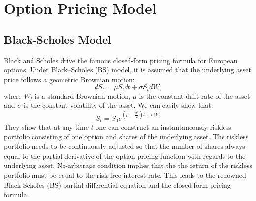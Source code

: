 \documentclass[letterpaper,12pt,titlepage,oneside,final]{book}
\numberwithin{equation}{section}
\theoremstyle{definition}
\begin{document}
\section{Option Pricing Model}
\label{sec:pricing}
\subsection{Black-Scholes Model}
\label{sec:bs}


Black and Scholes \cite{black1973pricing} drive the famous closed-form pricing formula for European options. 
Under Black–Scholes (BS) model, it is assumed that the underlying asset price follows a geometric Brownian motion:
\[
dS_t=\mu S_t dt+\sigma S_t dW_t
\]
where $W_t$ is a standard Brownian motion, $\mu$ is the constant drift rate of  the asset and $\sigma$ is the constant volatility of the asset. We can easily show that:
\[
S_t=S_0 e^{(\mu-\frac{\sigma^2}{2})t+\sigma W_t}
\]
They show that at any time $t$ one can construct an instantaneously riskless portfolio consisting of one option and shares of the underlying asset. The riskless portfolio needs to be continuously adjusted so that the number of shares always equal to the partial derivative of the option pricing function with regards to the underlying asset. No-arbitrage condition implies that the the return of the riskless portfolio must be equal to the risk-free interest rate. This leads to the renowned Black-Scholes (BS) partial differential equation and the closed-form pricing formula.
\end{document}

